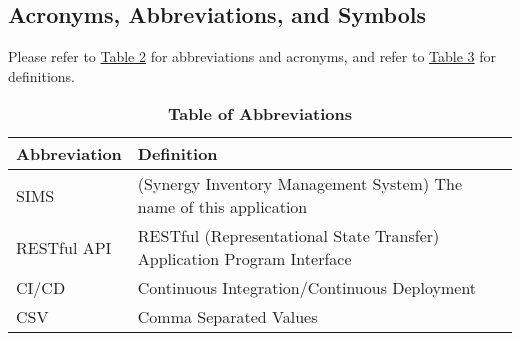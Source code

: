 \documentclass[12pt, titlepage]{article}
\begin{document}
\subsection{Acronyms, Abbreviations, and Symbols}
Please refer to \hyperref[table:abbr]{Table 2} for abbreviations and acronyms, and refer to \hyperref[table:def]{Table 3} for definitions.
\newpage
\begin{table}[h]
\caption{\textbf{Table of Abbreviations}} \label{table:abbr}

\begin{tabularx}{\textwidth}{p{3cm}X}
\toprule
\textbf{Abbreviation} & \textbf{Definition} \\
\midrule
SIMS & (Synergy Inventory Management System) The name of this application \\
RESTful API & RESTful (Representational State Transfer) Application Program Interface \\
CI/CD & Continuous Integration/Continuous Deployment \\
CSV & Comma Separated Values \\
\bottomrule
\end{tabularx}

\end{table}
\end{document}
